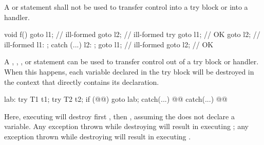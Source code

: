 \pnum
{}%
%
%
%
%
%
A  or  statement shall not be used to transfer control
into a try block or into a handler.
\begin{example}
\begin{codeblock}
void f() {
  goto l1;          // ill-formed
  goto l2;          // ill-formed
  try {
    goto l1;        // OK
    goto l2;        // ill-formed
    l1: ;
  } catch (...) {
    l2: ;
    goto l1;        // ill-formed
    goto l2;        // OK
  }
}

\end{codeblock}
\end{example}
%
%
%
%
%
%
%
%
A
,
,
,
or
statement can be used to transfer control out of
a try block or handler.
When this happens, each variable declared in the try block
will be destroyed in the context that
directly contains its declaration.
\begin{example}

\begin{codeblock}
lab:  try {
  T1 t1;
  try {
    T2 t2;
    if (@@)
      goto lab;
    } catch(...) { @@ }
  } catch(...) { @@ }
\end{codeblock}

Here, executing
will destroy first
,
then
,
assuming the
does not declare a variable.
Any exception thrown while destroying
will result in executing
;
any exception thrown while destroying
will result in executing
.
\end{example}

